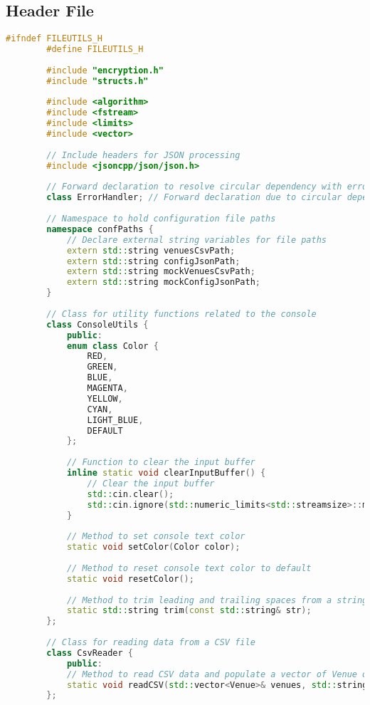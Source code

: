 \documentclass{article}
\begin{document}
	\subsection*{Header File}
	\begin{mdframed}[backgroundcolor=background, hidealllines=false, innerleftmargin=15pt, innerrightmargin=5pt, innertopmargin=0pt, innerbottommargin=-5pt, linecolor=accent]
	\begin{lstlisting}[language=C++]
		#ifndef FILEUTILS_H
		#define FILEUTILS_H
		
		#include "encryption.h"
		#include "structs.h"
		
		#include <algorithm>
		#include <fstream> 
		#include <limits>
		#include <vector>
		
		// Include headers for JSON processing
		#include <jsoncpp/json/json.h>
		
		// Forward declaration to resolve circular dependency with errorhandler.h
		class ErrorHandler; // Forward declaration due to circular dependency between fileutils.h and errorhandler.h
		
		// Namespace to hold configuration file paths
		namespace confPaths {
			// Declare external string variables for file paths
			extern std::string venuesCsvPath;
			extern std::string configJsonPath;
			extern std::string mockVenuesCsvPath;
			extern std::string mockConfigJsonPath;
		}
		
		// Class for utility functions related to the console
		class ConsoleUtils {
			public:
			enum class Color {
				RED,
				GREEN,
				BLUE,
				MAGENTA,
				YELLOW,
				CYAN,
				LIGHT_BLUE,
				DEFAULT
			};
			
			// Function to clear the input buffer
			inline static void clearInputBuffer() {
				// Clear the input buffer
				std::cin.clear();
				std::cin.ignore(std::numeric_limits<std::streamsize>::max(), '\n'); // Clear input buffer
			}
			
			// Method to set console text color
			static void setColor(Color color);
			
			// Method to reset console text color to default
			static void resetColor();
			
			// Method to trim leading and trailing spaces from a string
			static std::string trim(const std::string& str);
		};
		
		// Class for reading data from a CSV file
		class CsvReader {
			public:
			// Method to read CSV data and populate a vector of Venue objects
			static void readCSV(std::vector<Venue>& venues, std::string& venuesCsvPath);
		};
		

\end{lstlisting}
\end{mdframed}
\end{document}
